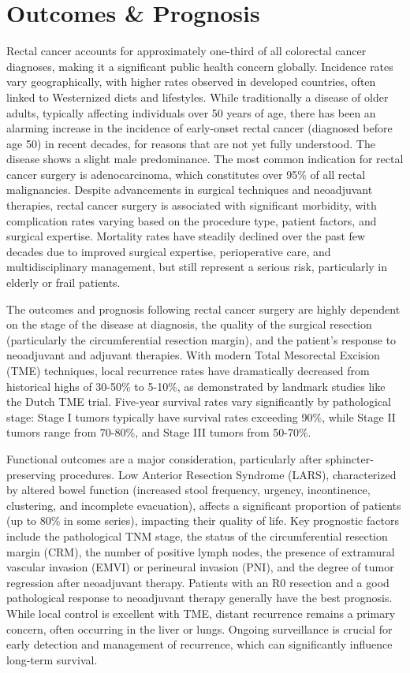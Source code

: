 \section*{Outcomes \& Prognosis}
Rectal cancer accounts for approximately one-third of all colorectal cancer diagnoses, making it a significant public health concern globally. Incidence rates vary geographically, with higher rates observed in developed countries, often linked to Westernized diets and lifestyles. While traditionally a disease of older adults, typically affecting individuals over 50 years of age, there has been an alarming increase in the incidence of early-onset rectal cancer (diagnosed before age 50) in recent decades, for reasons that are not yet fully understood. The disease shows a slight male predominance. The most common indication for rectal cancer surgery is adenocarcinoma, which constitutes over 95\% of all rectal malignancies. Despite advancements in surgical techniques and neoadjuvant therapies, rectal cancer surgery is associated with significant morbidity, with complication rates varying based on the procedure type, patient factors, and surgical expertise. Mortality rates have steadily declined over the past few decades due to improved surgical expertise, perioperative care, and multidisciplinary management, but still represent a serious risk, particularly in elderly or frail patients.

The outcomes and prognosis following rectal cancer surgery are highly dependent on the stage of the disease at diagnosis, the quality of the surgical resection (particularly the circumferential resection margin), and the patient's response to neoadjuvant and adjuvant therapies. With modern Total Mesorectal Excision (TME) techniques, local recurrence rates have dramatically decreased from historical highs of 30-50\% to 5-10\%, as demonstrated by landmark studies like the Dutch TME trial. Five-year survival rates vary significantly by pathological stage: Stage I tumors typically have survival rates exceeding 90\%, while Stage II tumors range from 70-80\%, and Stage III tumors from 50-70\%.

Functional outcomes are a major consideration, particularly after sphincter-preserving procedures. Low Anterior Resection Syndrome (LARS), characterized by altered bowel function (increased stool frequency, urgency, incontinence, clustering, and incomplete evacuation), affects a significant proportion of patients (up to 80\% in some series), impacting their quality of life. Key prognostic factors include the pathological TNM stage, the status of the circumferential resection margin (CRM), the number of positive lymph nodes, the presence of extramural vascular invasion (EMVI) or perineural invasion (PNI), and the degree of tumor regression after neoadjuvant therapy. Patients with an R0 resection and a good pathological response to neoadjuvant therapy generally have the best prognosis. While local control is excellent with TME, distant recurrence remains a primary concern, often occurring in the liver or lungs. Ongoing surveillance is crucial for early detection and management of recurrence, which can significantly influence long-term survival.

